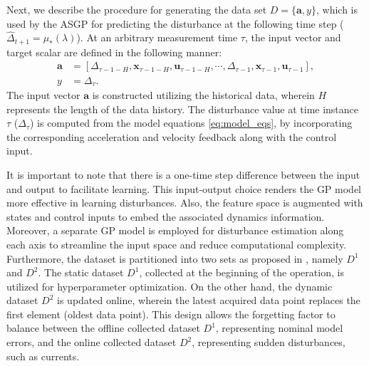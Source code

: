 Next, we describe the procedure for generating the data set $ D = \bigl\{\mathbf{a}, y\bigl\}$, which is used by the \ac{ASGP} for predicting the disturbance at the following time step ($\hat{\Delta}_{t+1} = \mu_*(\lambda)$). At an arbitrary measurement time $\tau$, the input vector and target scalar are defined in the following manner:  
%
\begin{align} \label{eq:gp_data}
\mathbf{a} &= [ \Delta_{\tau-1-H}, \mathbf{x}_{\tau-1-H}, \mathbf{u}_{\tau-1-H}, \cdots, \Delta_{\tau-1}, \mathbf{x}_{\tau-1}, \mathbf{u}_{\tau-1}], \\
y &=  \Delta_{\tau}. \label{eq:input_target}
\end{align}
%
The input vector $\mathbf{a}$ is constructed utilizing the historical data, wherein $H$ represents the length of the data history. 
The disturbance value at time instance $\tau$ ($\Delta_{\tau}$) is computed from the model equations \eqref{eq:model_eqs}, by incorporating the corresponding acceleration and velocity feedback along with the control input. %

It is important to note that there is a one-time step difference between the input and output to facilitate learning. This input-output choice renders the \ac{GP} model more effective in learning disturbances. Also, the feature space is augmented with states and control inputs to embed the associated dynamics information. Moreover, a separate \ac{GP} model is employed for disturbance estimation along each axis to streamline the input space and reduce computational complexity. Furthermore, the dataset is partitioned into two sets as proposed in \cite{mohit_gp}, namely $D^1$ and $D^2$. The static dataset $D^1$, collected at the beginning of the operation, is utilized for hyperparameter optimization. On the other hand, the dynamic dataset $D^2$ is updated online, wherein the latest acquired data point replaces the first element (oldest data point). This design allows the forgetting factor to balance between the offline collected dataset $D^1$, representing nominal model errors, and the online collected dataset $D^2$, representing sudden disturbances, such as currents.


